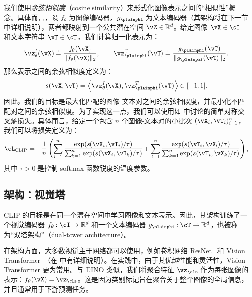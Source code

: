 \documentclass[../../book-main_zh.tex]{subfiles}
\begin{document}
我们使用\textit{余弦相似度}（cosine similarity）来形式化图像表示之间的“相似性”概念。具体而言，设 \(f_{\theta}\) 为图像编码器，\(g_{\plainphi}\) 为文本编码器（其架构将在下一节中详细说明），两者都映射到一个公共潜在空间 \(\vZ \in \mathbb{R}^{d}\)。给定图像 \(\vX \in \cI\) 和文本字符串 \(\vT \in \cT\)，我们计算归一化表示为：
\begin{equation}
    \vz^{I}_{\theta}(\vX) \doteq \frac{f_{\theta}(\vX)}{\|f_{\theta}(\vX)\|_2},
    \qquad
    \vz^{T}_{\plainphi}(\vT) \doteq \frac{g_{\plainphi}(\vT)}{\|g_{\plainphi}(\vT)\|_2}.
\end{equation}
那么表示之间的余弦相似度定义为：
\begin{equation}
    s(\vX,\vT)
    =
    \left\langle \vz^{I}_{\theta}(\vX), \vz^{T}_{\plainphi}(\vT)\right\rangle
    \in [-1,1].
\end{equation}
因此，我们的目标是最大化匹配的图像-文本对之间的余弦相似度，并最小化不匹配对之间的余弦相似度。为了实现这一点，我们可以使用如  中讨论的简单对称交叉熵损失。具体而言，给定一个包含 \(n\) 个图像-文本对的小批次 \((\vX_i, \vT_i)_{i=1}^{n}\)，我们可以将损失定义为：
\begin{equation}\label{eq:practical_clip_loss}
    \cL_{\text{CLIP}} = -\frac{1}{n}\left(
    \sum_{i=1}^{n}
    \frac{\exp(s(\vX_i,\vT_i)/\tau)}{\sum_{k=1}^{n}\exp(s(\vX_i,\vT_k)/\tau)}
    +
    \sum_{i=1}^{n}
    \frac{\exp(s(\vT_i,\vX_i)/\tau)}{\sum_{k=1}^{n}\exp(s(\vT_i,\vX_k)/\tau)}
    \right),
\end{equation}
其中 \(\tau > 0\) 是控制 softmax 函数锐度的温度参数。 

\subsection{架构：视觉塔}\label{sub:clip_vision_tower}
CLIP 的目标是在同一个潜在空间中学习图像和文本表示。因此，其架构训练了一个视觉编码器 \(f_{\theta}: \cI \to \mathbb{R}^{d} \) 和一个文本编码器 \(g_{\plainphi}: \cT \to \mathbb{R}^{d} \)，也被称为“双塔架构”（dual-tower architecture）。

在架构方面，大多数视觉主干网络都可以使用，例如卷积网络 ResNet~\citep{He2016-lc} 和 Vision Transformer~\citep{dosovitskiy2020image}（在  中有详细说明）。在实践中，由于其优越性能和灵活性，Vision Transformer 更为常用。与 DINO 类似，我们将聚合特征 \(\vz_{\cls}\) 作为每张图像的表示：\(f_{\theta}(\vX) = \vz_{\cls}\)。这是因为类别标记旨在聚合关于整个图像的全局信息，并且通常用于下游预测任务。
\end{document}
